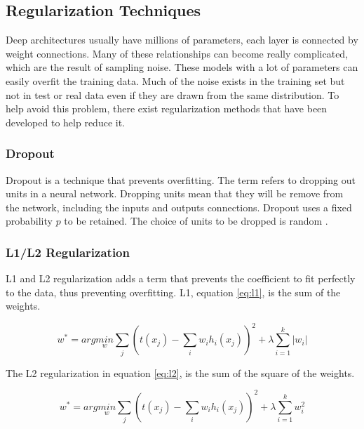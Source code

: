 \subsection{Regularization Techniques}

Deep architectures usually have millions of parameters, each layer is connected by weight connections. 
Many of these relationships can become really complicated, which are the result of sampling noise. These models with a lot of parameters can easily overfit the training data. Much of the noise exists in the training set but not in test or real data even if they are drawn from the same distribution. To help avoid this problem, there exist regularization methods that have been developed to help reduce it.

\subsubsection{Dropout}
Dropout is a technique that prevents overfitting. The term refers to dropping out units in a neural network. Dropping units mean that they will be remove from the network, including the inputs and outputs connections. Dropout uses a fixed probability $p$ to be retained. The choice of units to be dropped is random \cite{Srivastava2014Dropout:Overfitting}.



\subsubsection{L1/L2 Regularization}
L1 and L2 regularization adds a term that prevents the coefficient to fit perfectly to the data, thus preventing overfitting. L1, equation \ref{eq:l1}, is the sum of the weights. 

\begin{equation} \label{eq:l1}
w^{*}= arg \underset{w}{min} \sum_{j} \left ( t(x_{j})- \sum_{i}w_{i}h_{i}(x_{j}) \right )^{2} + \lambda \sum_{i=1}^{k}\left | w_{i} \right |
\end{equation}

The L2 regularization in equation \ref{eq:l2}, is the sum of the square of the weights.

\begin{equation} \label{eq:l2}
w^{*}= arg \underset{w}{min} \sum_{j} \left ( t(x_{j})- \sum_{i}w_{i}h_{i}(x_{j}) \right )^{2} + \lambda \sum_{i=1}^{k} w_{i}^{2}
\end{equation}

